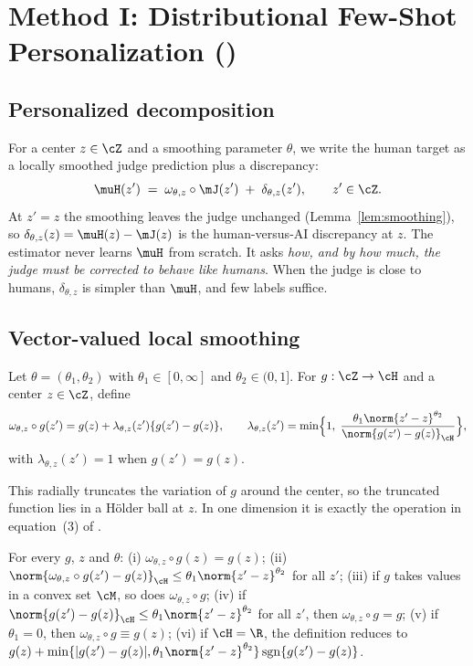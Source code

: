 \section{Method I: Distributional Few-Shot Personalization (\dfsp)}
\label{sec:dfsp}

\subsection{Personalized decomposition}

For a center $z\in\cZ$ and a smoothing parameter $\theta$, we write the human target as a locally
smoothed judge prediction plus a discrepancy:
\begin{equation}
  \muH(z') \;=\; \omega_{\theta,z}\circ\mJ(z') \;+\; \delta_{\theta,z}(z'), \qquad z'\in\cZ .
  \label{eq:decomp}
\end{equation}
At $z'=z$ the smoothing leaves the judge unchanged (Lemma~\ref{lem:smoothing}), so
$\delta_{\theta,z}(z)=\muH(z)-\mJ(z)$ is the human-versus-AI discrepancy at $z$. The estimator never
learns $\muH$ from scratch. It asks \emph{how, and by how much, the judge must be corrected to behave
like humans}. When the judge is close to humans, $\delta_{\theta,z}$ is simpler than $\muH$, and few
labels suffice.

\subsection{Vector-valued local smoothing}

\begin{definition}
\label{def:smoothing}
Let $\theta=(\theta_1,\theta_2)$ with $\theta_1\in[0,\infty]$ and $\theta_2\in(0,1]$. For
$g:\cZ\to\cH$ and a center $z\in\cZ$, define
\[
  \omega_{\theta,z}\circ g(z') = g(z) + \lambda_{\theta,z}(z')\{g(z')-g(z)\},\qquad
  \lambda_{\theta,z}(z') = \min\Bigl\{1,\;\frac{\theta_1\norm{z'-z}^{\theta_2}}{\norm{g(z')-g(z)}_{\cH}}\Bigr\},
\]
with $\lambda_{\theta,z}(z')=1$ when $g(z')=g(z)$.
\end{definition}

This radially truncates the variation of $g$ around the center, so the truncated function lies in a
H\"older ball at $z$. In one dimension it is exactly the operation in equation~(3) of
\citet{li2026personalizing}.

\begin{lemma}
\label{lem:smoothing}
For every $g$, $z$ and $\theta$:
(i) $\omega_{\theta,z}\circ g(z)=g(z)$;
(ii) $\norm{\omega_{\theta,z}\circ g(z')-g(z)}_{\cH}\le\theta_1\norm{z'-z}^{\theta_2}$ for all $z'$;
(iii) if $g$ takes values in a convex set $\cM$, so does $\omega_{\theta,z}\circ g$;
(iv) if $\norm{g(z')-g(z)}_{\cH}\le\theta_1\norm{z'-z}^{\theta_2}$ for all $z'$, then
$\omega_{\theta,z}\circ g=g$;
(v) if $\theta_1=0$, then $\omega_{\theta,z}\circ g\equiv g(z)$;
(vi) if $\cH=\R$, the definition reduces to
$g(z)+\min\{|g(z')-g(z)|,\theta_1\norm{z'-z}^{\theta_2}\}\operatorname{sgn}\{g(z')-g(z)\}$.
\end{lemma}

